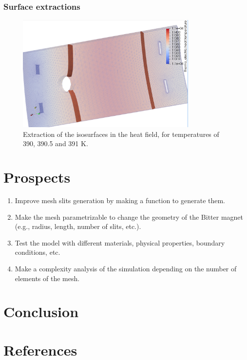 \documentclass[12pt]{article}
\begin{document}
\subsubsection{Surface extractions}

\begin{figure}[H]
  \centering
  \includegraphics[width=0.8\textwidth]{images/isosurfaces.png}
  \caption{Extraction of the isosurfaces in the heat field, for temperatures of 390, 390.5 and 391 K.}
\end{figure}

\section{Prospects}
\begin{enumerate}
  \item Improve mesh slits generation by making a function to generate them.
  \item Make the mesh parametrizable to change the geometry of the Bitter magnet
    (e.g., radius, length, number of slits, etc.).
  \item Test the model with different materials, physical properties, boundary conditions, etc.
  \item Make a complexity analysis of the simulation depending on the number of elements of the mesh.
\end{enumerate}

\section{Conclusion}

\newpage

\section{References}
\printbibliography
\end{document}
